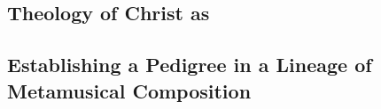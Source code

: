 



\subsection{Theology of Christ as }




\subsection{Establishing a Pedigree in a Lineage of Metamusical Composition}

